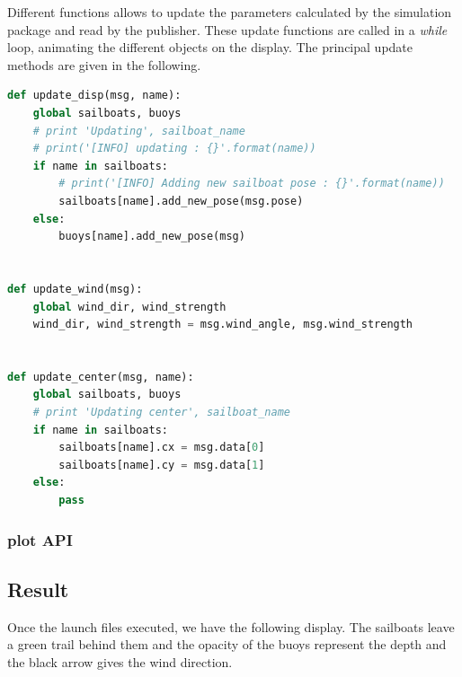 \documentclass[a4paper]{report}
\begin{document}
Different functions allows to update the  parameters calculated by the simulation package and read by the publisher. These update functions are called in a \textit{while} loop, animating the different objects on the display. The principal update methods are given in the following.  

\renewcommand{\lstlistingname}{Code}
\begin{lstlisting}[caption=Update Functions, frame=single,language=Python]
def update_disp(msg, name):
    global sailboats, buoys
    # print 'Updating', sailboat_name
    # print('[INFO] updating : {}'.format(name))
    if name in sailboats:
        # print('[INFO] Adding new sailboat pose : {}'.format(name))
        sailboats[name].add_new_pose(msg.pose)
    else:
        buoys[name].add_new_pose(msg)


def update_wind(msg):
    global wind_dir, wind_strength
    wind_dir, wind_strength = msg.wind_angle, msg.wind_strength


def update_center(msg, name):
    global sailboats, buoys
    # print 'Updating center', sailboat_name
    if name in sailboats:
        sailboats[name].cx = msg.data[0]
        sailboats[name].cy = msg.data[1]
    else:
        pass


\end{lstlisting}

\subsubsection{plot API}

\subsection{Result}

Once the launch files executed, we have the following display. The sailboats leave a green trail behind them and the opacity of the buoys represent the depth and the black arrow gives the wind direction. 
\end{document}

